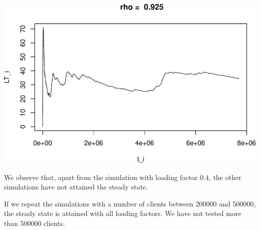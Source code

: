 \documentclass[]{article}
\begin{document}
\includegraphics{003_files/figure-latex/unnamed-chunk-10-4.pdf}

We observe that, apart from the simulation with loading factor 0.4, the
other simulations have not attained the steady state.

If we repeat the simulations with a number of clients between 200000 and
500000, the steady state is attained with all loading factors. We have
not tested more than 500000 clients.
\end{document}
